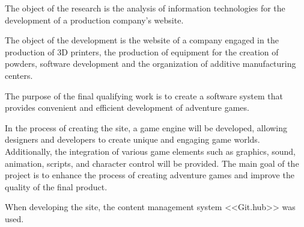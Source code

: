 The object of the research is the analysis of information technologies for the development of a production company's website.

The object of the development is the website of a company engaged in the production of 3D printers, the production of equipment for the creation of powders, software development and the organization of additive manufacturing centers.

The purpose of the final qualifying work is to create a software system that provides convenient and efficient development of adventure games.

In the process of creating the site, a game engine will be developed, allowing designers and developers to create unique and engaging game worlds. Additionally, the integration of various game elements such as graphics, sound, animation, scripts, and character control will be provided. The main goal of the project is to enhance the process of creating adventure games and improve the quality of the final product.

When developing the site, the content management system <<Git.hub>> was used.

